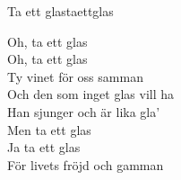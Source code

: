 \begin{song}{Ta ett glas}{taettglas}

\begin{vers}
Oh, ta ett glas\\
Oh, ta ett glas\\
Ty vinet för oss samman\\
Och den som inget glas vill ha\\
Han sjunger och är lika gla'\\
Men ta ett glas\\
Ja ta ett glas\\
För livets fröjd och gamman\\
\end{vers}
\end{song}
